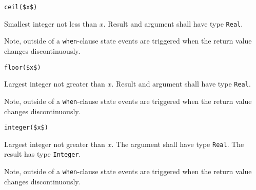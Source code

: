 \begin{operatordefinition}[ceil]
\begin{synopsis}\begin{lstlisting}
ceil($x$)
\end{lstlisting}\end{synopsis}
\begin{semantics}
Smallest integer not less than $x$.
Result and argument shall have type \lstinline!Real!.
\begin{nonnormative}
Note, outside of a \lstinline!when!-clause state events are triggered when the return value changes discontinuously.
\end{nonnormative}
\end{semantics}
\end{operatordefinition}

\begin{operatordefinition}[floor]
\begin{synopsis}\begin{lstlisting}
floor($x$)
\end{lstlisting}\end{synopsis}
\begin{semantics}
Largest integer not greater than $x$.
Result and argument shall have type \lstinline!Real!.
\begin{nonnormative}
Note, outside of a \lstinline!when!-clause state events are triggered when the return value changes discontinuously.
\end{nonnormative}
\end{semantics}
\end{operatordefinition}

\begin{operatordefinition}[integer]
\begin{synopsis}\begin{lstlisting}
integer($x$)
\end{lstlisting}\end{synopsis}
\begin{semantics}
Largest integer not greater than $x$.
The argument shall have type \lstinline!Real!.
The result has type \lstinline!Integer!.
\begin{nonnormative}
Note, outside of a \lstinline!when!-clause state events are triggered when the return value changes discontinuously.
\end{nonnormative}
\end{semantics}
\end{operatordefinition}

